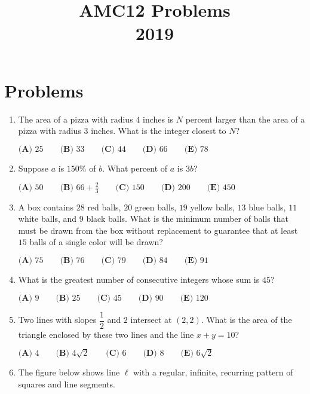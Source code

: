 \documentclass{article}
\title{AMC12 Problems \\ 2019}
\date{}
\begin{document}
\maketitle\thispagestyle{fancy}\newpage\section*{Problems}\begin{enumerate}[label=\arabic*., itemsep=0.5em]\item The area of a pizza with radius $4$ inches is $N$ percent larger than the area of a pizza with radius $3$ inches. What is the integer closest to $N$?

$\textbf{(A) } 25 \qquad\textbf{(B) } 33 \qquad\textbf{(C) } 44\qquad\textbf{(D) } 66 \qquad\textbf{(E) } 78$\par \vspace{0.5em}\item Suppose $a$ is $150\%$ of $b$. What percent of $a$ is $3b$?

$\textbf{(A) } 50 \qquad \textbf{(B) } 66+\frac{2}{3} \qquad \textbf{(C) } 150 \qquad \textbf{(D) } 200 \qquad \textbf{(E) } 450$\par \vspace{0.5em}\item A box contains $28$ red balls, $20$ green balls, $19$ yellow balls, $13$ blue balls, $11$ white balls, and $9$ black balls. What is the minimum number of balls that must be drawn from the box without replacement to guarantee that at least $15$ balls of a single color will be drawn?

$\textbf{(A) } 75 \qquad\textbf{(B) } 76 \qquad\textbf{(C) } 79 \qquad\textbf{(D) } 84 \qquad\textbf{(E) } 91$\par \vspace{0.5em}\item What is the greatest number of consecutive integers whose sum is $45$?

$\textbf{(A) } 9 \qquad\textbf{(B) } 25 \qquad\textbf{(C) } 45 \qquad\textbf{(D) } 90 \qquad\textbf{(E) } 120$\par \vspace{0.5em}\item Two lines with slopes $\dfrac{1}{2}$ and $2$ intersect at $(2,2)$. What is the area of the triangle enclosed by these two lines and the line $x+y=10$?

$\textbf{(A) } 4 \qquad\textbf{(B) } 4\sqrt{2} \qquad\textbf{(C) } 6 \qquad\textbf{(D) } 8 \qquad\textbf{(E) } 6\sqrt{2}$\par \vspace{0.5em}\item The figure below shows line $\ell$ with a regular, infinite, recurring pattern of squares and line segments.



\end{enumerate}
\end{document}
